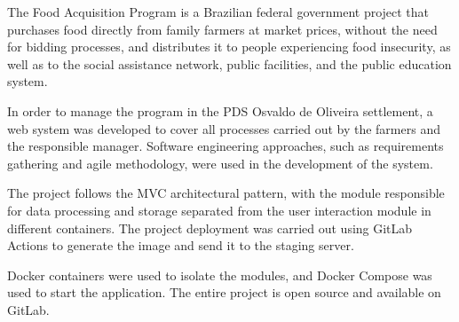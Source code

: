 \documentclass[grad,pdftex]{poli}
\begin{document}
\clearpage{}
  \clearpage{}\begin{abstract}
    

O Programa de Aquisição de Alimentos é um projeto do governo federal que realiza compras diretas de alimentos dos agricultores familiares a preço de mercado sem a necessidade de licitações e distribui para pessoas em situação de insegurança alimentar, assim como a rede socioassistencial, equipamentos públicos e a rede pública de ensino. A fim de realizar a gestão do programa no assentamento PDS - Osvaldo de Oliveira, foi desenvolvido um sistema web que contemple todos os processos realizados pelos agricultores e o gestor responsável. Para o desenvolvimento do sistema foram usadas abordagens de engenharia de software, como levantamento de requisitos e metodologia ágil. O projeto segue o padrão arquitetural MVC, sendo o módulo responsável pelo processamento e armazenamento de dados e o módulo de interação com o usuário separados em containers. O deploy do projeto foi feito usando o GitLab actions para a geração da imagem e o envio para o servidor de homologação. Foram usados o Docker container para isolar os módulos e o Docker Compose para inicializar a aplicação. Todo o projeto é open source e está disponível no GitLab.


\end{abstract}
\clearpage{}
  \clearpage{}\begin{foreignabstract}

The Food Acquisition Program is a Brazilian federal government project that purchases food directly from family farmers at market prices, without the need for bidding processes, and distributes it to people experiencing food insecurity, as well as to the social assistance network, public facilities, and the public education system.

In order to manage the program in the PDS Osvaldo de Oliveira settlement, a web system was developed to cover all processes carried out by the farmers and the responsible manager. Software engineering approaches, such as requirements gathering and agile methodology, were used in the development of the system.

The project follows the MVC architectural pattern, with the module responsible for data processing and storage separated from the user interaction module in different containers. The project deployment was carried out using GitLab Actions to generate the image and send it to the staging server.

Docker containers were used to isolate the modules, and Docker Compose was used to start the application. The entire project is open source and available on GitLab.


\end{foreignabstract}
\end{document}
